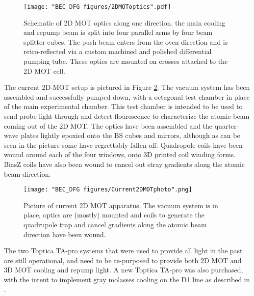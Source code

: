 \begin{figure}
	\texttt{[image: "BEC\_DFG figures/2DMOToptics".pdf]}
\caption{Schematic of 2D MOT optics along one direction. the main cooling and repump beam is split into four parallel arms by four beam splitter cubes. The push beam enters from the oven direction and is retro-reflected via a custom machined and polished differential pumping tube. These optics are mounted on crosses attached to the 2D MOT cell.}
\label{fig:2DMOToptics}
\end{figure}

The current 2D-MOT setup is pictured in Figure \ref{fig:Current2DMOTphoto}. The vacuum system has been assembled and successfully pumped down, with a octagonal test chamber in place of the main experimental chamber. This test chamber is intended to be used to send probe light through and detect flourescence to characterize the atomic beam coming out of the 2D MOT. The optics have been assembled and the quarter-wave plates lightly epoxied onto the BS cubes and mirrors, although as can be seen in the picture some have regrettably fallen off. Quadropole coils have been wound around each of the four windows, onto 3D printed coil winding forms. BiasZ coils have also been wound to cancel out stray gradients along the atomic beam direction.
\begin{figure}
	\texttt{[image: "BEC\_DFG figures/Current2DMOTphoto".png]}
\caption{Picture of current 2D MOT apparatus. The vacuum system is in place, optics are (mostly) mounted and coils to generate the quadrupole trap and cancel gradients along the atomic beam direction have been wound.  }
\label{fig:Current2DMOTphoto}
\end{figure}

The two Toptica TA-pro systems that were used to provide all \K{} light in the past are still operational, and need to be re-purposed to provide both 2D MOT and 3D MOT cooling and repump light. A new Toptica TA-pro was also purchased, with the intent to implement gray molasses cooling on the \K{} D1 line as described in \cite{Fernandes2012}. 